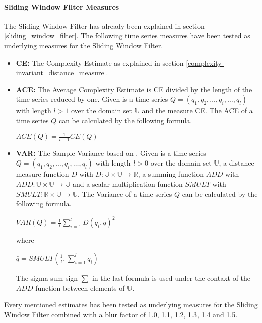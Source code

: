 \paragraph{Sliding Window Filter Measures} \label{sliding_window_filter_measures}
The Sliding Window Filter has already been explained in section \ref{sliding_window_filter}. The following time series
measures have been tested as underlying measures for the Sliding Window Filter.

\begin{itemize}
    \item \textbf{CE:} The Complexity Estimate as explained in section \ref{complexity-invariant_distance_measure}.
    \item \textbf{ACE:} The Average Complexity Estimate is CE divided by the length of the time series reduced by one.
    Given is a time series $Q = (q_1, q_2, \dots, q_i, \dots, q_l)$ with length $l > 1$ over the domain set $\mathbb{U}$
    and the measure CE. The ACE of a time series $Q$ can be calculated by the following formula.
    \begin{center}
        $ACE(Q) = \frac{1}{l - 1}CE(Q)$
    \end{center}
    \item \textbf{VAR:} The Sample Variance based on \cite{chan1983algorithms}. Given is a time series
    $Q = (q_1, q_2, \dots, q_i, \dots, q_l)$ with length $l > 0$ over the domain set $\mathbb{U}$, a distance measure
    function $D$ with $D: \mathbb{U} \times \mathbb{U} \to \mathbb{R}$, a summing function $ADD$ with
    $ADD: \mathbb{U} \times \mathbb{U} \to \mathbb{U}$ and a scalar multiplication function $SMULT$ with
    $SMULT: \mathbb{R} \times \mathbb{U} \to \mathbb{U}$. The Variance of a time series $Q$ can be calculated by the
    following formula.
    \begin{center}
        $VAR(Q) = \frac{1}{l}\sum \limits_{i=1}^{l} D(q_i, \bar{q})^2$
    \end{center}
    where
    \begin{center}
        $\bar{q} = SMULT(\frac{1}{l}, \sum \limits_{i=1}^{l} q_i)$
    \end{center}
    The sigma sum sign $\sum$ in the last formula is used under the contaxt of the $ADD$ function between elements of
    $\mathbb{U}$.
\end{itemize}
Every mentioned estimates has been tested as underlying measures for the Sliding Window Filter combined with a blur
factor of 1.0, 1.1, 1.2, 1.3, 1.4 and 1.5.
